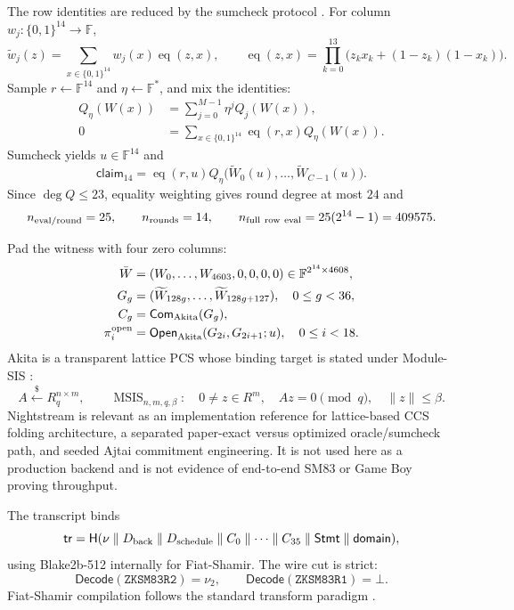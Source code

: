 \documentclass[10pt]{article}
\numberwithin{equation}{section}
\newcommand{\F}{\mathbb{F}}
\newcommand{\B}{\{0,1\}}
\newcommand{\Com}{\mathsf{Com}}
\newcommand{\Open}{\mathsf{Open}}
\newcommand{\Hash}{\mathsf{H}}
\newcommand{\eq}{\operatorname{eq}}
\newcommand{\mle}{\widetilde}
\newcommand{\Stmt}{\mathsf{Stmt}}
\newcommand{\code}[1]{\texttt{#1}}
\DeclareMathOperator{\MSIS}{MSIS}
\begin{document}
The row identities are reduced by the sumcheck protocol \citep{sumcheck}.
For column $w_j:\B^{14}\to\F$,
\begin{equation}
 \mle w_j(z)=\sum_{x\in\B^{14}}w_j(x)\eq(z,x),\qquad
 \eq(z,x)=\prod_{k=0}^{13}\bigl(z_kx_k+(1-z_k)(1-x_k)\bigr).
\end{equation}
Sample $r\leftarrow\F^{14}$ and $\eta\leftarrow\F^*$, and mix the identities:
\begin{align}
 Q_\eta(W(x))&=\sum_{j=0}^{M-1}\eta^jQ_j(W(x)),\\
 0&=\sum_{x\in\B^{14}}\eq(r,x)Q_\eta(W(x)).
 \label{eq:sumcheck-claim}
\end{align}
Sumcheck yields $u\in\F^{14}$ and
\begin{equation}
 \mathsf{claim}_{14}=\eq(r,u)Q_\eta
 \bigl(\mle W_0(u),\ldots,\mle W_{C-1}(u)\bigr).
 \label{eq:sumcheck-terminal}
\end{equation}
Since $\deg Q\le23$, equality weighting gives round degree at most $24$ and
\begin{equation}
 n_{\rm eval/round}=25,\qquad n_{\rm rounds}=14,\qquad
 n_{\rm full\ row\ eval}=25(2^{14}-1)=409575.
 \label{eq:sumcheck-cost}
\end{equation}

Pad the witness with four zero columns:
\begin{align}
 \bar W&=(W_0,\ldots,W_{4603},0,0,0,0)\in\F^{2^{14}\times4608},\\
 G_g&=(\mle W_{128g},\ldots,\mle W_{128g+127}),\quad 0\le g<36,\\
 C_g&=\Com_{\rm Akita}(G_g),\\
 \pi_i^{\rm open}&=\Open_{\rm Akita}(G_{2i},G_{2i+1};u),\quad0\le i<18.
 \label{eq:pcs-layout}
\end{align}
Akita is a transparent lattice PCS whose binding target is stated under Module-SIS
\citep{akita,akitapost}:
\begin{equation}
 A\xleftarrow{\$}R_q^{n\times m},\qquad
 \MSIS_{n,m,q,\beta}:\quad
 0\ne z\in R^m,\quad Az=0\pmod q,\quad\|z\|\le\beta.
 \label{eq:msis}
\end{equation}
Nightstream \citep{nightstream} is relevant as an implementation reference for lattice-based
CCS folding architecture, a separated paper-exact versus optimized oracle/sumcheck path, and
seeded Ajtai commitment engineering.  It is not used here as a production backend and is not
evidence of end-to-end SM83 or Game Boy proving throughput.

The transcript binds
\begin{equation}
 \mathsf{tr}=\Hash(\nu\parallel D_{\rm back}\parallel D_{\rm schedule}
 \parallel C_0\parallel\cdots\parallel C_{35}\parallel\Stmt\parallel\mathsf{domain}),
 \label{eq:transcript}
\end{equation}
using Blake2b-512 internally for Fiat-Shamir.  The wire cut is strict:
\begin{equation}
 \mathsf{Decode}(\code{ZKSM83R2})=\nu_2,\qquad
 \mathsf{Decode}(\code{ZKSM83R1})=\bot.
\end{equation}
Fiat-Shamir compilation follows the standard transform paradigm \citep{fiatshamir}.
\end{document}
